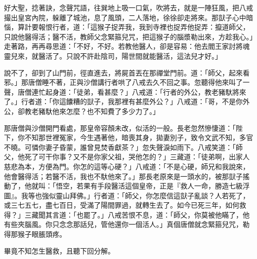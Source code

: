 好大聖，捻著訣，念聲咒語，往巽地上吸一口氣，吹將去，就是一陣狂風，把八戒撮出皇宮內院，躲離了城池，息了風頭，二人落地，徐徐卻走將來。那獃子心中暗惱，算計要報恨行者，道：「這猴子捉弄我，我到寺裡也捉弄他捉弄：攛道師父，只說他醫得活；醫不活，教師父念緊箍兒咒，把這猴子的腦漿勒出來，方趁我心。」走著路，再再尋思道：「不好，不好。若教他醫人，卻是容易：他去閻王家討將魂靈兒來，就醫活了。只說不許赴陰司，陽世間就能醫活，這法兒才好。」

說不了，卻到了山門前，徑直進去，將屍首丟在那禪堂門前。道：「師父，起來看邪。」那唐僧睡不著，正與沙僧講行者哄了八戒去久不回之事。忽聽得他來叫了一聲，唐僧連忙起身道：「徒弟，看甚麼？」八戒道：「行者的外公，教老豬馱將來了。」行者道：「你這饢糟的獃子，我那裡有甚麼外公？」八戒道：「哥，不是你外公，卻教老豬馱他來怎麼？也不知費了多少力了。」

那唐僧與沙僧開門看處，那皇帝容顏未改，似活的一般。長老忽然慘悽道：「陛下，你不知那世裡冤家，今生遇著他，暗喪其身，拋妻別子，致令文武不知，多官不曉。可憐你妻子昏蒙，誰曾見焚香獻茶？」忽失聲淚如雨下。八戒笑道：「師父，他死了可干你事？又不是你家父祖，哭他怎的？」三藏道：「徒弟啊，出家人慈悲為本，方便為門。你怎的這等心硬？」八戒道：「不是心硬，師兄和我說來，他會醫得活；若醫不活，我也不馱他來了。」那長老原來是一頭水的，被那獃子搖動了，他就叫：「悟空，若果有手段醫活這個皇帝，正是『救人一命，勝造七級浮圖』。我等也強似靈山拜佛。」行者道：「師父，你怎麼信這獃子亂談？人若死了，或三七五七，盡七百日，受滿了陽間罪過，就轉生去了。如今已死三年，如何救得？」三藏聞其言道：「也罷了。」八戒苦恨不息，道：「師父，你莫被他瞞了，他有些夾腦風。你只念念那話兒，管他還你一個活人。」真個唐僧就念緊箍兒咒，勒得那猴子眼脹頭疼。

畢竟不知怎生醫救，且聽下回分解。

